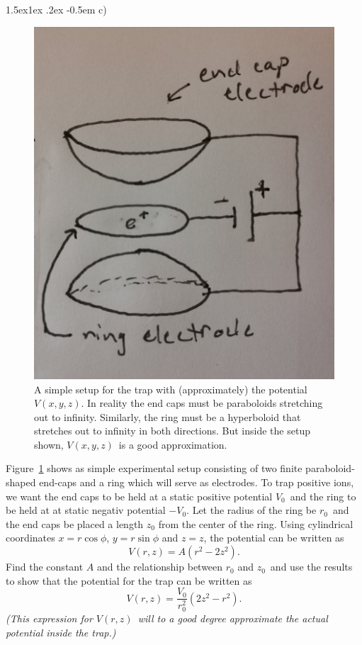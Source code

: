\documentclass[%
oneside,                 %
final,                   %
10pt]{article}
\makeatletter
\newenvironment{doconceexercise}{}{}
\newcommand\subex{\@startsection{paragraph}{4}{\z@}%
                  {1.5ex\@plus1ex \@minus.2ex}%
                  {-0.5em}%
                  {\normalfont\normalsize\bfseries}}
\makeatother
\begin{document}
\begin{doconceexercise}

\subex{c)}

\begin{figure}[!ht]  %
  \centerline{\includegraphics[width=0.5\linewidth]{figures/penningtrap_noB.jpg}}
  \caption{
  A simple setup for the trap with (approximately) the potential $V(x,y,z)$. In reality the end caps must be paraboloids stretching out to infinity. Similarly, the ring must be a hyperboloid that stretches out to infinity in both directions. But inside the setup shown, $V(x,y,z)$ is a good approximation. \label{fig:penningtrap_noB}
  }
\end{figure}


Figure~\ref{fig:penningtrap_noB} shows as simple experimental setup consisting of two finite paraboloid-shaped end-caps and a ring which will serve as electrodes. To trap positive ions, we want the end caps to be held at a static positive potential $V_0$ and the ring  to be held at at static negativ potential $-V_0$. Let the radius of the ring be $r_0$ and the end caps be placed a length $z_0$ from the center of the ring. Using cylindrical coordinates $x = r\cos\phi$, $y = r\sin\phi$ and $z = z$, the potential can be written as
\begin{equation}
  V(r,z) = A(r^2 - 2z^2).
\end{equation}
Find the constant $A$ and the relationship between $r_0$ and $z_0$ and use the results to show that the potential for the trap can be written as
\begin{equation}
  V(r,z) = \frac{V_0}{r_0^2}(2z^2 - r^2).
\end{equation}
\emph{(This expression for $V(r,z)$ will to a good degree approximate the actual potential inside the trap.)}



\end{doconceexercise}
\end{document}
